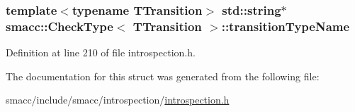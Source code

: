 \subsubsection[{\texorpdfstring{transition\+Type\+Name}{transitionTypeName}}]{\setlength{\rightskip}{0pt plus 5cm}template$<$typename T\+Transition$>$ std\+::string$\ast$ {\bf smacc\+::\+Check\+Type}$<$ T\+Transition $>$\+::transition\+Type\+Name}\hypertarget{structsmacc_1_1CheckType_a6402dc8352758d361781773dc1e8523f}{}\label{structsmacc_1_1CheckType_a6402dc8352758d361781773dc1e8523f}


Definition at line 210 of file introspection.\+h.



The documentation for this struct was generated from the following file\+:\begin{DoxyCompactItemize}
\item 
smacc/include/smacc/introspection/\hyperlink{introspection_8h}{introspection.\+h}\end{DoxyCompactItemize}
